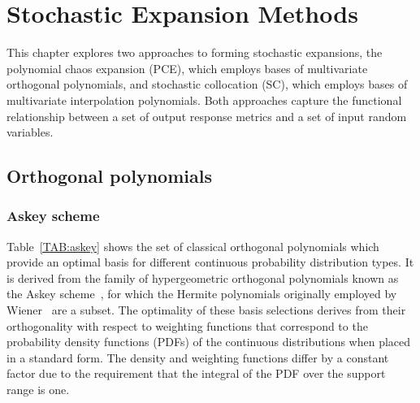 \chapter{Stochastic Expansion Methods}\label{uq:expansion}


This chapter explores two approaches to forming stochastic expansions,
the polynomial chaos expansion (PCE), which employs bases of
multivariate orthogonal polynomials, and stochastic collocation (SC),
which employs bases of multivariate interpolation polynomials.  Both
approaches capture the functional relationship between a set of output
response metrics and a set of input random variables.

\section{Orthogonal polynomials} \label{uq:expansion:orth}

\subsection{Askey scheme} \label{uq:expansion:orth:askey}

Table~\ref{TAB:askey} shows the set of classical orthogonal
polynomials which provide an optimal basis for different continuous
probability distribution types.  It is derived from the family of
hypergeometric orthogonal polynomials known as the Askey
scheme~\cite{askey}, for which the Hermite polynomials originally
employed by Wiener~\cite{wiener} are a subset.  The optimality of
these basis selections derives from their orthogonality with respect
to weighting functions that correspond to the probability density
functions (PDFs) of the continuous distributions when placed in a
standard form.  The density and weighting functions differ by a
constant factor due to the requirement that the integral of the PDF
over the support range is one.

